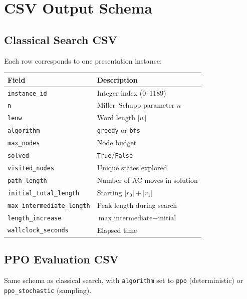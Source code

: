 \documentclass[11pt,a4paper]{article}
\begin{document}
\section{CSV Output Schema}\label{sec:csv-schema}

\subsection{Classical Search CSV}

Each row corresponds to one presentation instance:

\begin{table}[h]
\centering
\small
\begin{tabular}{lp{8cm}}
  \toprule
  \textbf{Field} & \textbf{Description} \\
  \midrule
  \texttt{instance\_id}       & Integer index (0--1189) \\
  \texttt{n}                  & Miller--Schupp parameter $n$ \\
  \texttt{lenw}               & Word length $|w|$ \\
  \texttt{algorithm}          & \texttt{greedy} or \texttt{bfs} \\
  \texttt{max\_nodes}         & Node budget \\
  \texttt{solved}             & \texttt{True}/\texttt{False} \\
  \texttt{visited\_nodes}     & Unique states explored \\
  \texttt{path\_length}       & Number of AC moves in solution \\
  \texttt{initial\_total\_length} & Starting $|r_0| + |r_1|$ \\
  \texttt{max\_intermediate\_length} & Peak length during search \\
  \texttt{length\_increase}   & $\text{max\_intermediate} - \text{initial}$ \\
  \texttt{wallclock\_seconds} & Elapsed time \\
  \bottomrule
\end{tabular}
\end{table}

\subsection{PPO Evaluation CSV}

Same schema as classical search, with \texttt{algorithm} set to \texttt{ppo}
(deterministic) or \texttt{ppo\_stochastic} (sampling).
\end{document}
